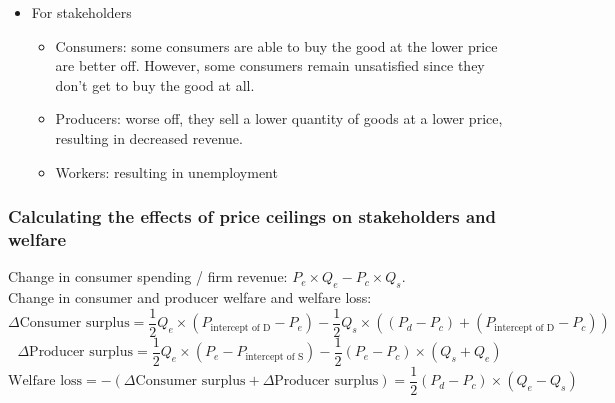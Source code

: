 \begin{itemize}
\begin{itemize}
  \end{itemize}
  \item For stakeholders
  \begin{itemize}
    \item Consumers: some consumers are able to buy the good at the lower price are better off. However, some consumers remain unsatisfied since they don't get to buy the good at all.
    \item Producers: worse off, they sell a lower quantity of goods at a lower price, resulting in decreased revenue.
    \item Workers: resulting in unemployment
  \end{itemize}
\end{itemize}
\subsubsection*{Calculating the effects of price ceilings on stakeholders and welfare}
Change in consumer spending / firm revenue: $P_e\times Q_e-P_c\times Q_s$.\\
Change in consumer and producer welfare and welfare loss:
\[\Delta \text{Consumer surplus}=\dfrac{1}{2}Q_e\times (P_\text{intercept of D}-P_e)-\dfrac{1}{2}Q_s\times((P_d-P_c)+(P_\text{intercept of D}-P_c))\]
\[\Delta \text{Producer surplus}=\dfrac{1}{2}Q_e\times(P_e-P_\text{intercept of S})-\dfrac{1}{2}(P_e-P_c)\times (Q_s+Q_e)\]
\[\text{Welfare loss}=-(\Delta \text{Consumer surplus}+\Delta \text{Producer surplus})=\dfrac{1}{2}(P_d-P_c)\times (Q_e-Q_s)\]
\begin{center}
\end{center}
